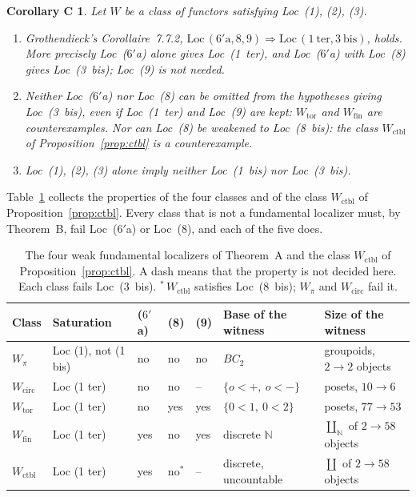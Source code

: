 \documentclass[11pt,a4paper]{article}
\newtheorem*{corollaryC}{Corollary C}
\theoremstyle{definition}
\newcommand{\Wpi}{W_{\pi}}
\newcommand{\Wcirc}{W_{\mathrm{circ}}}
\newcommand{\Wtor}{W_{\mathrm{tor}}}
\newcommand{\Wfin}{W_{\mathrm{fin}}}
\newcommand{\Wctbl}{W_{\mathrm{ctbl}}}
\newcommand{\N}{\mathbb{N}}
\begin{document}
\begin{corollaryC}
Let $W$ be a class of functors satisfying Loc~\textup{(1)}, \textup{(2)}, \textup{(3)}.
\begin{enumerate}
\item[(i)] Grothendieck's Corollaire~7.7.2, $\mathrm{Loc}\,(6'\mathrm{a},8,9)\Rightarrow
\mathrm{Loc}\,(1\ \mathrm{ter},3\ \mathrm{bis})$, holds. More precisely Loc~\textup{($6'$a)}
alone gives Loc~\textup{(1~ter)}, and Loc~\textup{($6'$a)} with Loc~\textup{(8)} gives
Loc~\textup{(3~bis)}; Loc~\textup{(9)} is not needed.
\item[(ii)] Neither Loc~\textup{($6'$a)} nor Loc~\textup{(8)} can be omitted from the
hypotheses giving Loc~\textup{(3~bis)}, even if Loc~\textup{(1~ter)} and Loc~\textup{(9)} are
kept: $\Wtor$ and $\Wfin$ are counterexamples. Nor can Loc~\textup{(8)} be weakened to
Loc~\textup{(8~bis)}: the class $\Wctbl$ of Proposition~\ref{prop:ctbl} is a counterexample.
\item[(iii)] Loc~\textup{(1)}, \textup{(2)}, \textup{(3)} alone imply neither
Loc~\textup{(1~bis)} nor Loc~\textup{(3~bis)}.
\end{enumerate}
\end{corollaryC}

Table~\ref{tab:classes} collects the properties of the four classes and of the class
$\Wctbl$ of Proposition~\ref{prop:ctbl}. Every class that is not a fundamental localizer must,
by Theorem~B, fail Loc~($6'$a) or Loc~(8), and each of the five does.

\begin{table}[ht]
\centering
\small
\begin{tabular}{@{}lllllll@{}}
\toprule
Class & Saturation & ($6'$a) & (8) & (9) & Base of the witness & Size of the witness\\
\midrule
$\Wpi$ & Loc (1), not (1 bis) & no & no & no & $BC_2$ & groupoids, $2\to2$ objects\\
$\Wcirc$ & Loc (1 ter) & no & no & -- & $\{o<+,\ o<-\}$ & posets, $10\to6$\\
$\Wtor$ & Loc (1 ter) & no & yes & yes & $\{0<1,\ 0<2\}$ & posets, $77\to53$\\
$\Wfin$ & Loc (1 ter) & yes & no & yes & discrete $\N$ & $\coprod_{\N}$ of $2\to58$ objects\\
$\Wctbl$ & Loc (1 ter) & yes & no$^{*}$ & -- & discrete, uncountable & $\coprod$ of $2\to58$ objects\\
\bottomrule
\end{tabular}
\caption{The four weak fundamental localizers of Theorem~A and the class $\Wctbl$ of
Proposition~\ref{prop:ctbl}. A dash means that the property is not decided here. Each class
fails Loc~(3~bis). ${}^{*}$\,$\Wctbl$ satisfies Loc~(8~bis); $\Wpi$ and $\Wcirc$ fail it.}
\label{tab:classes}
\end{table}
\end{document}
